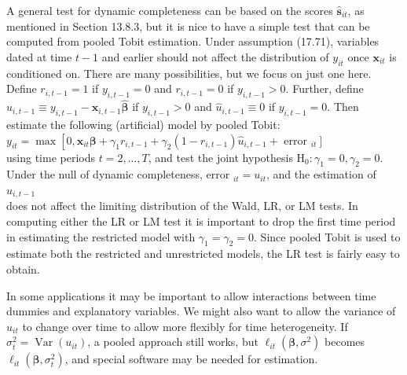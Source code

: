 \documentclass[10pt]{article}
\begin{document}
A general test for dynamic completeness can be based on the scores $\hat{\mathbf{s}}_{i t}$, as mentioned in Section 13.8.3, but it is nice to have a simple test that can be computed from pooled Tobit estimation. Under assumption (17.71), variables dated at time $t-1$ and earlier should not affect the distribution of $y_{i t}$ once $\mathbf{x}_{i t}$ is conditioned on. There are many possibilities, but we focus on just one here. Define $r_{i, t-1}=1$ if $y_{i, t-1}=0$ and $r_{i, t-1}=0$ if $y_{i, t-1}>0$. Further, define $\hat{u}_{i, t-1} \equiv y_{i, t-1}-\mathbf{x}_{i, t-1} \hat{\boldsymbol{\beta}}$ if $y_{i, t-1}>0$ and $\hat{u}_{i, t-1} \equiv 0$ if $y_{i, t-1}=0$. Then estimate the following (artificial) model by pooled Tobit:\\
$y_{i t}=\max \left[0, \mathbf{x}_{i t} \boldsymbol{\beta}+\gamma_{1} r_{i, t-1}+\gamma_{2}\left(1-r_{i, t-1}\right) \hat{u}_{i, t-1}+\right.$ error $\left._{i t}\right]$\\
using time periods $t=2, \ldots, T$, and test the joint hypothesis $\mathrm{H}_{0}: \gamma_{1}=0, \gamma_{2}=0$. Under the null of dynamic completeness, error ${ }_{i t}=u_{i t}$, and the estimation of $u_{i, t-1}$\\
does not affect the limiting distribution of the Wald, LR, or LM tests. In computing either the LR or LM test it is important to drop the first time period in estimating the restricted model with $\gamma_{1}=\gamma_{2}=0$. Since pooled Tobit is used to estimate both the restricted and unrestricted models, the LR test is fairly easy to obtain.

In some applications it may be important to allow interactions between time dummies and explanatory variables. We might also want to allow the variance of $u_{i t}$ to change over time to allow more flexibly for time heterogeneity. If $\sigma_{t}^{2}=\operatorname{Var}\left(u_{i t}\right)$, a pooled approach still works, but $\ell_{i t}\left(\boldsymbol{\beta}, \sigma^{2}\right)$ becomes $\ell_{i t}\left(\boldsymbol{\beta}, \sigma_{t}^{2}\right)$, and special software may be needed for estimation.
\end{document}
